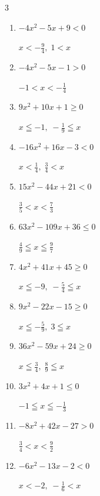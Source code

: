 \begin{multicols}{3}
\begin{enumerate}
        $\displaystyle \frac{1}{8} < x < \frac{1}{5}$

  \item $-4x^{2}-5x+9<0$

        $\displaystyle x < -\frac{9}{4} , \; 1 < x$

  \item $-4x^{2}-5x-1>0$

        $\displaystyle -1 < x < -\frac{1}{4}$

  \item $9x^{2}+10x+1\geq 0$

        $\displaystyle x \leqq -1 , \; -\frac{1}{9} \leqq x$

  \item $-16x^{2}+16x-3<0$

        $\displaystyle x < \frac{1}{4} , \; \frac{3}{4} < x$

  \item $15x^{2}-44x+21<0$

        $\displaystyle \frac{3}{5} < x < \frac{7}{3}$

  \item $63x^{2}-109x+36\leq 0$

        $\displaystyle \frac{4}{9} \leqq x \leqq \frac{9}{7}$

  \item $4x^{2}+41x+45\geq 0$

        $\displaystyle x \leqq -9 , \; -\frac{5}{4} \leqq x$

  \item $9x^{2}-22x-15\geq 0$

        $\displaystyle x \leqq -\frac{5}{9} , \; 3 \leqq x$

\columnbreak %

  \item $36x^{2}-59x+24\geq 0$

        $\displaystyle x \leqq \frac{3}{4} , \; \frac{8}{9} \leqq x$

  \item $3x^{2}+4x+1\leq 0$

        $\displaystyle -1 \leqq x \leqq -\frac{1}{3}$

  \item $-8x^{2}+42x-27>0$

        $\displaystyle \frac{3}{4} < x < \frac{9}{2}$

  \item $-6x^{2}-13x-2<0$

        $\displaystyle x < -2 , \; -\frac{1}{6} < x$


\end{enumerate}
\end{multicols}

